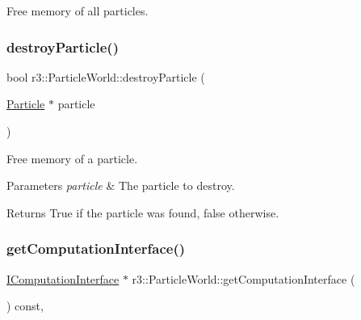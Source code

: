Free memory of all particles. 

\mbox{\label{classr3_1_1_particle_world_a1802231868ed6d99dd677ef71328781a}} 
\subsubsection{\texorpdfstring{destroy\+Particle()}{destroyParticle()}}
{\footnotesize\ttfamily bool r3\+::\+Particle\+World\+::destroy\+Particle (\begin{DoxyParamCaption}\item[{\mbox{\hyperlink{classr3_1_1_particle}{Particle}} $\ast$}]{particle }\end{DoxyParamCaption})}



Free memory of a particle. 


\begin{DoxyParams}{Parameters}
{\em particle} & The particle to destroy. \\
\hline
\end{DoxyParams}
\begin{DoxyReturn}{Returns}
True if the particle was found, false otherwise. 
\end{DoxyReturn}
\mbox{\label{classr3_1_1_particle_world_a1e806bf89ec6445a54b9534f1efc081f}} 
\subsubsection{\texorpdfstring{get\+Computation\+Interface()}{getComputationInterface()}}
{\footnotesize\ttfamily \mbox{\hyperlink{classr3_1_1_i_computation_interface}{I\+Computation\+Interface}} $\ast$ r3\+::\+Particle\+World\+::get\+Computation\+Interface (\begin{DoxyParamCaption}{ }\end{DoxyParamCaption}) const\hspace{0.3cm}{\ttfamily [override]}, {\ttfamily [virtual]}}



